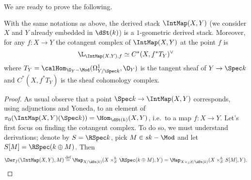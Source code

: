         We are ready to prove the following.
        \begin{prop}
            \label{prop:map_curves_cotangent}
            With the same notations as above, the derived stack $\IntMap(X, Y)$ (we consider $X$ and $Y$ already embedded in $\dSt(k)$) is a $1$-geometric derived stack. Moreover, for any $f\colon X \to Y$ the cotangent complex of $\IntMap(X, Y)$ at the point $f$ is \[\L_{\IntMap(X, Y), f} \simeq C^*(X, f^*T_Y )^{\vee}\] where $T_Y = \calHom_{\O_Y-\Mod}(\Omega^1_{Y/\Spec k}, \O_Y)$ is the tangent sheaf of $Y \to \Spec k$ and $C^*(X, f^*T_Y)$ is the sheaf cohomology complex.
        \end{prop}
        \begin{proof}
            As usual observe that a point $\Spec k \to \IntMap(X, Y)$ corresponds, using adjunctions and Yoneda, to an element of $\pi_0(\IntMap(X, Y)(\Spec k)) = \Hom_{\dSt(k)}(X, Y)$, i.e.\ to a map $f\colon X \to Y$.
            Let's first focus on finding the cotangent complex. To do so, we must understand derivations; denote by $S = \RSpec k$, pick $M \in sk-\Mod$ and  let $S[M] = \RSpec(k \oplus M)$. Then \[\Der_f(\IntMap(X, Y), M) \stackrel{\textrm{def}}{=} \Map_{X/\dSt(k)}(X \times_S^h\, \RSpec(k \oplus M), Y) = \Map_{X \times_S S/\dSt(k)}(X \times^h_S\, S[M], Y). \] 


\end{proof}

